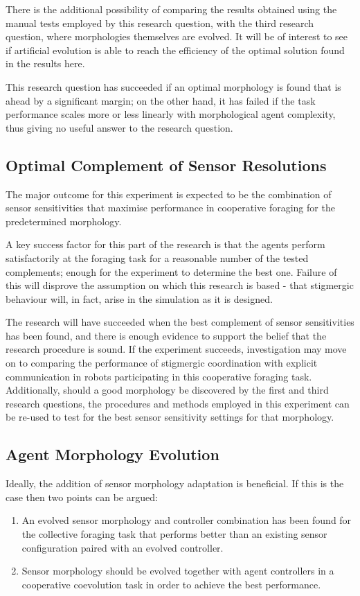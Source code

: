 \documentclass[a4paper,12pt]{article}
\begin{document}
There is the additional possibility of comparing the results obtained using the manual tests employed by this research question, with the third research question, where morphologies themselves are evolved. It will be of interest to see if artificial evolution is able to reach the efficiency of the optimal solution found in the results here.

This research question has succeeded if an optimal morphology is found that is ahead by a significant margin; on the other hand, it has failed if the task performance scales more or less linearly with morphological agent complexity, thus giving no useful answer to the research question.

\subsection{Optimal Complement of Sensor Resolutions}
The major outcome for this experiment is expected to be the combination of sensor sensitivities that maximise performance in cooperative foraging for the predetermined morphology.

A key success factor for this part of the research is that the agents perform satisfactorily at the foraging task for a reasonable number of the tested complements; enough for the experiment to determine the best one. Failure of this will disprove the assumption on which this research is based - that stigmergic behaviour will, in fact, arise in the simulation as it is designed.

The research will have succeeded when the best complement of sensor sensitivities has been found, and there is enough evidence to support the belief that the research procedure is sound. If the experiment succeeds, investigation may move on to comparing the performance of stigmergic coordination with explicit communication in robots participating in this cooperative foraging task. Additionally, should a good morphology be discovered by the first and third research questions, the procedures and methods employed in this experiment can be re-used to test for the best sensor sensitivity settings for that morphology.
 
\subsection{Agent Morphology Evolution}
Ideally, the addition of sensor morphology adaptation is beneficial. If this is the case then two points can be argued:
\begin{enumerate}
\item An evolved sensor morphology and controller combination has been found for the collective foraging task that performs better than an existing sensor configuration paired with an evolved controller.
\item Sensor morphology should be evolved together with agent controllers in a cooperative coevolution task in order to achieve the best performance.
\end{enumerate}
\end{document}
